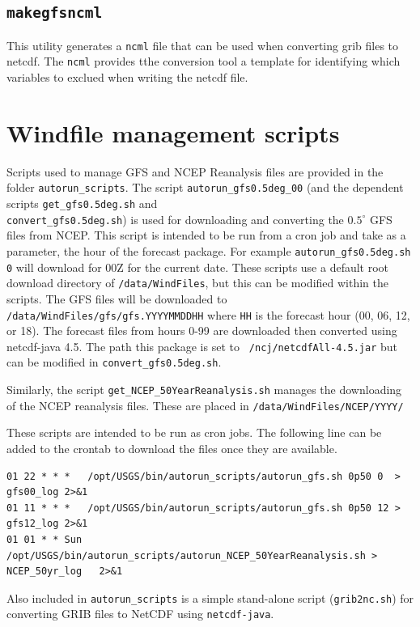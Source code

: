 \documentclass[11pt]{article}   %
\begin{document}
\subsection{\texttt{makegfsncml}}
This utility generates a \texttt{ncml} file that can be used when converting
grib files to netcdf.  The \texttt{ncml} provides tthe conversion tool a template
for identifying which variables to exclued when writing the netcdf file.

\section{Windfile management scripts}
Scripts used to manage GFS and NCEP Reanalysis files are provided in the
folder \texttt{autorun\_scripts}.
The script \texttt{autorun\_gfs0.5deg\_00} (and the dependent scripts
\texttt{get\_gfs0.5deg.sh} and\\
\texttt{convert\_gfs0.5deg.sh}) is used for downloading and
converting the $0.5^{\circ}$ GFS files from NCEP.  This script is intended to be
run from a cron job and take as a parameter, the hour of the forecast package.  For example
\texttt{autorun\_gfs0.5deg.sh 0} will download for 00Z for the current date.  These 
scripts use a default root download directory of \texttt{/data/WindFiles}, but this can
be modified within the scripts.  The GFS files will be downloaded to\\
\texttt{/data/WindFiles/gfs/gfs.YYYYMMDDHH} where \texttt{HH} is the forecast hour
(00, 06, 12, or 18).  The forecast files from hours 0-99 are downloaded then converted using
netcdf-java 4.5.  The path this package is set to \texttt{~/ncj/netcdfAll-4.5.jar} but can be
modified in \texttt{convert\_gfs0.5deg.sh}.

Similarly, the script \texttt{get\_NCEP\_50YearReanalysis.sh} manages the downloading of 
the NCEP reanalysis files.  These are placed in \texttt{/data/WindFiles/NCEP/YYYY/}

These scripts are intended to be run as cron jobs.  The following line can be added to the
crontab to download the files once they are available.
\footnotesize
\begin{verbatim}
01 22 * * *   /opt/USGS/bin/autorun_scripts/autorun_gfs.sh 0p50 0  > gfs00_log 2>&1
01 11 * * *   /opt/USGS/bin/autorun_scripts/autorun_gfs.sh 0p50 12 > gfs12_log 2>&1
01 01 * * Sun /opt/USGS/bin/autorun_scripts/autorun_NCEP_50YearReanalysis.sh > NCEP_50yr_log   2>&1
\end{verbatim}
\normalsize

Also included in \texttt{autorun\_scripts} is a simple stand-alone script (\texttt{grib2nc.sh})
for converting GRIB files to NetCDF using \texttt{netcdf-java}.
\end{document}
